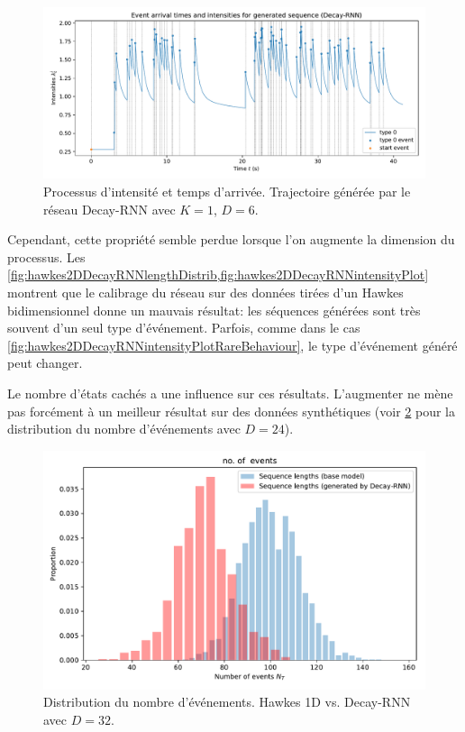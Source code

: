 \documentclass[../main.tex]{subfiles}
\begin{document}
\begin{figure}[htp]
	\includegraphics[width=\linewidth]{../results/intensity_Decay-RNN_1d_hidden8_20181202-140621.pdf}
	\caption{Processus d'intensité et temps d'arrivée. Trajectoire générée par le réseau Decay-RNN avec $K=1$, $D=6$.}\label{fig:hawkes1DRNNintensityPlot}
\end{figure}

Cependant, cette propriété semble perdue lorsque l'on augmente la dimension du processus. Les \cref{fig:hawkes2DDecayRNNlengthDistrib,fig:hawkes2DDecayRNNintensityPlot} montrent que le calibrage du réseau sur des données tirées d'un Hawkes bidimensionnel donne un mauvais résultat: les séquences générées sont très souvent d'un seul type d'événement. Parfois, comme dans le cas \cref{fig:hawkes2DDecayRNNintensityPlotRareBehaviour}, le type d'événement généré peut changer.

Le nombre d'états cachés a une influence sur ces résultats. L'augmenter ne mène pas forcément à un meilleur résultat sur des données synthétiques (voir \cref{fig:hawkes1DDecayRNNlengthDistribHidden32} pour la distribution du nombre d'événements avec $D=24$).

\begin{figure}[htp]
	\includegraphics[width=\linewidth]{../results/seq_length_distrib_Decay-RNN-1d-hidden_32-20181202-141923.pdf}
	\caption{Distribution du nombre d'événements. Hawkes 1D vs. Decay-RNN avec $D=32$.}\label{fig:hawkes1DDecayRNNlengthDistribHidden32}
\end{figure}
\end{document}
